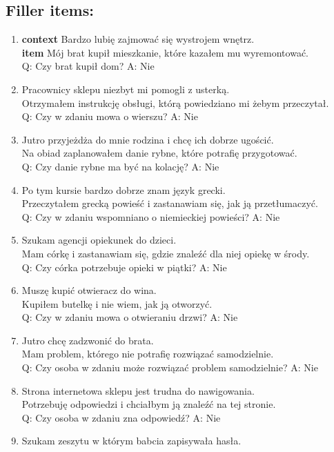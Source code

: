 \subsection*{Filler items:}
\begin{enumerate}
\item \textbf{context} Bardzo lubię zajmować się wystrojem wnętrz.\\
	\textbf{item} Mój brat kupił mieszkanie, które kazałem mu wyremontować.\\
	Q: Czy brat kupił dom? A: Nie
\item Pracownicy sklepu niezbyt mi pomogli z usterką.\\
	Otrzymałem instrukcję obsługi, którą powiedziano mi żebym przeczytał.\\
	Q: Czy w zdaniu mowa o wierszu? A: Nie
\item Jutro przyjeżdża do mnie rodzina i chcę ich dobrze ugościć.\\
	Na obiad zaplanowałem danie rybne, które potrafię przygotować.\\
	Q: Czy danie rybne ma być na kolację? A: Nie
\item Po tym kursie bardzo dobrze znam język grecki.\\
	Przeczytałem grecką powieść i zastanawiam się, jak ją przetłumaczyć.\\
	Q: Czy w zdaniu wspomniano o niemieckiej powieści? A: Nie
\item Szukam agencji opiekunek do dzieci.\\
	Mam córkę i zastanawiam się, gdzie znaleźć dla niej opiekę w środy.\\
	Q: Czy córka potrzebuje opieki w piątki? A: Nie
\item Muszę kupić otwieracz do wina.\\
	Kupiłem butelkę i nie wiem, jak ją otworzyć.\\
	Q: Czy w zdaniu mowa o otwieraniu drzwi? A: Nie
\item Jutro chcę zadzwonić do brata.\\
	Mam problem, którego nie potrafię rozwiązać samodzielnie.\\
	Q: Czy osoba w zdaniu może rozwiązać problem samodzielnie? A: Nie
\item Strona internetowa sklepu jest trudna do nawigowania.\\
	Potrzebuję odpowiedzi i chciałbym ją znaleźć na tej stronie.\\
	Q: Czy osoba w zdaniu zna odpowiedź? A: Nie
\item Szukam zeszytu w którym babcia zapisywała hasła.\\

\end{enumerate}
